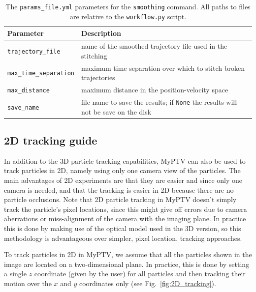 \documentclass[10pt,a4paper]{article}
\begin{document}
\begin{table}[!ht]
	\centering
	\caption{The \texttt{params\_file.yml} parameters for the \texttt{smoothing} command. All paths to files are relative to the \texttt{workflow.py} script.}
	\begin{tabular}{l m{12cm}}
		\hline
		Parameter & Description\\
		\hline
		
		\texttt{trajectory\_file} & name of the smoothed trajectory file used in the stitching \\
		
		\texttt{max\_time\_separation} & maximum time separation over which to stitch broken trajectories \\
		
		\texttt{max\_distance} & maximum distance in the position-velocity space \\
		
		\texttt{save\_name} & file name to save the results; if \texttt{None} the results will not be save on the disk \\
		
		\hline
	\end{tabular}
\end{table}










\subsection{2D tracking guide} \label{sec:2D_tracking}


In addition to the 3D particle tracking capabilities, MyPTV can also be used to track particles in 2D, namely using only one camera view of the particles. The main advantages of 2D experiments are that they are easier and since only one camera is needed, and that the tracking is easier in 2D because there are no particle occlusions. Note that 2D particle tracking in MyPTV doesn't simply track the particle's pixel locations, since this might give off errors due to camera aberrations or miss-alignment of the camera with the imaging plane. In practice this is done by making use of the optical model used in the 3D version, so this methodology is advantageous over simpler, pixel location, tracking approaches. 


To track particles in 2D in MyPTV, we assume that all the particles shown in the image are located on a two-dimensional plane. In practice, this is done by setting a single $z$ coordinate (given by the user) for all particles and then tracking their motion over the $x$ and $y$ coordinates only (see Fig.~\ref{fig:2D_tracking}).
\end{document}

